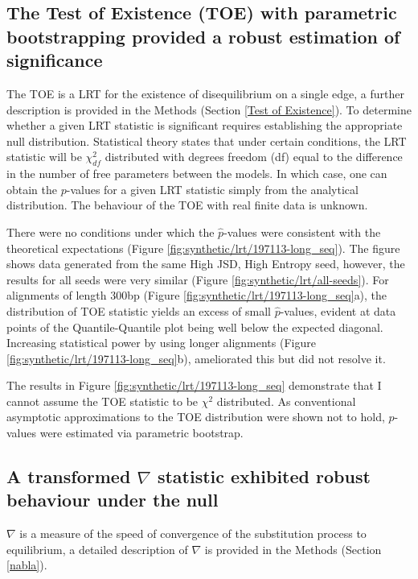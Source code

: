 \subsection{The Test of Existence (TOE) with parametric bootstrapping provided a robust estimation of significance}
\label{TOE_results}

The TOE is a LRT for the existence of disequilibrium on a single edge, a further description is provided in the Methods (Section \ref{Test of Existence}).  
To determine whether a given LRT statistic is significant requires establishing the appropriate null distribution. Statistical theory states that under certain conditions, the LRT statistic will be $\chi^2_{df}$ distributed with degrees freedom (df) equal to the difference in the number of free parameters between the models. In which case, one can obtain the $p$-values for a given LRT statistic simply from the analytical distribution. The behaviour of the TOE with real finite data is unknown. 

There were no conditions under which the $\hat p$-values were consistent with the theoretical expectations (Figure \ref{fig:synthetic/lrt/197113-long_seq}). The figure shows data generated from the same High JSD, High Entropy seed, however, the results for all seeds were very similar (Figure \ref{fig:synthetic/lrt/all-seeds}). For alignments of length 300bp (Figure \ref{fig:synthetic/lrt/197113-long_seq}a), the distribution of TOE statistic yields an excess of small $\hat p$-values, evident at data points of the Quantile-Quantile plot being well below the expected diagonal. Increasing statistical power by using longer alignments (Figure \ref{fig:synthetic/lrt/197113-long_seq}b), ameliorated this but did not resolve it.  



The results in Figure \ref{fig:synthetic/lrt/197113-long_seq} demonstrate that I cannot assume the TOE statistic to be $\chi^{2}$ distributed. As conventional asymptotic approximations to the TOE distribution were shown not to hold, $\hat p$-values were estimated via parametric bootstrap. 

\subsection{A transformed $\nabla$ statistic exhibited robust behaviour under the null}
\label{nabla_results}

$\nabla$ is a measure of the speed of convergence of the substitution process to equilibrium, a detailed description of $\nabla$ is provided in the Methods (Section \ref{nabla}). 

